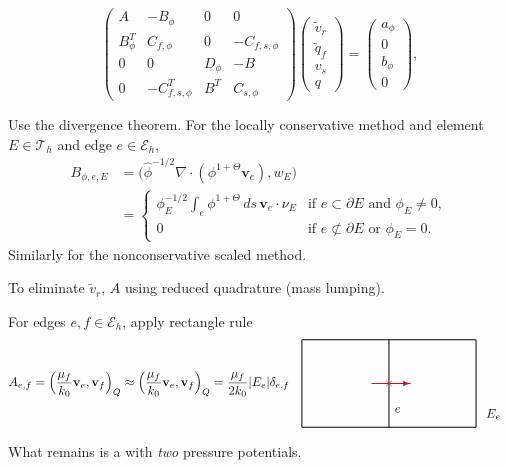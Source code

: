 \documentclass[usenames,dvipsnames,letterpaper,landscape,final]{slides}
\def\d{\partial}
\def\div{\nabla\cdot}
\def\v{\mathbf{v}}
\def\cE{{\cal E}}
\def\cT{{\cal T}}
\def\cE{\mathcal{E}}
\def\cT{\mathcal{T}}
\begin{document}
\begin{myslideNoFooter}

\vspace*{-12pt}\begin{equation*}
\left(\begin{matrix}
A&-B_{\phi}&0&0\\
B_{\phi}^T&C_{f,\phi}&0&-C_{f,s,\phi}\\
0&0&D_\phi&-B\\
0&-C_{f,s,\phi}^T&B^T&C_{s,\phi}
\end{matrix}\right)
\left(\begin{matrix}
\tilde{v}_r\\\tilde{q}_f\\ v_s\\q
\end{matrix}\right)
= \left(\begin{matrix}
a_\phi\\0\\b_\phi\\0
\end{matrix}\right),
\end{equation*}

 Use the divergence theorem.\newline
For the locally conservative method and element $E\in\cT_h$ and edge $e\in\cE_h$,
\begin{align*}
B_{\phi,e,E} &= \big(\hat{\phi}^{-1/2}\div (\phi^{1+\Theta}\v_e),w_E\big)\\
&= \begin{cases}\!\displaystyle \phi_E^{-1/2}\!\!\int_e\phi^{1+\Theta}\,ds\,\v_e\cdot\nu_E
                  &\text{if }e\subset\d E\text{ and }\phi_E\ne 0,\\
                0&\text{if }e\not\subset\d E\text{ or }\phi_E = 0.\end{cases}
\end{align*}
Similarly for the nonconservative scaled method.

 To eliminate $\tilde v_r$,  $A$ using
reduced quadrature (mass lumping). 

\bigskip
For edges $e,f\in\cE_h$, apply rectangle rule
\[
A_{e,f} = \Big(\frac{\mu_f}{k_0}\v_e,\v_f\Big)_Q
  \approx \Big(\frac{\mu_f}{k_0}\v_e,\v_f\Big)_Q = \frac{\mu_f}{2k_0}|E_e|\delta_{e,f}
\ \ \raisebox{-33pt}{\text{\hbox{\setlength\unitlength{3.5pt}
\begin{picture}(48,20)(-20,0)
\thicklines
\put(-20,0){\line(1,0){40}}\put(-20,20){\line(1,0){40}}
\put(-20,0){\line(0,1){20}}\put(0,0){\line(0,1){20}}\put(20,0){\line(0,1){20}}
\put(0,10){\makebox(0,0){\Maroon{$\times$}}}\put(-4,10){\Maroon{\vector(1,0){9}}}
\put(2,4){\makebox(0,0){$e$}}
\put(24,3){\makebox(0,0){$E_e$}}
\end{picture}}}}
\]

\medskip
What remains is a  with {\em two\/} pressure potentials.

\end{myslideNoFooter}
\end{document}
